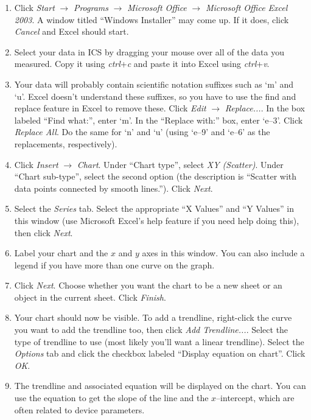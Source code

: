 \documentclass{article}
\begin{document}
\begin{enumerate}
  \item Click \textit{Start} $\rightarrow$ \textit{Programs} $\rightarrow$ \textit{Microsoft Office} $\rightarrow$ \textit{Microsoft Office Excel 2003}. A window titled ``Windows Installer'' may come up. If it does, click \textit{Cancel} and Excel should start.
  \item Select your data in ICS by dragging your mouse over all of the data you measured. Copy it using \textit{ctrl}+\textit{c} and paste it into Excel using \textit{ctrl}+\textit{v}.
  \item Your data will probably contain scientific notation suffixes such as `m' and `u'. Excel doesn't understand these suffixes, so you have to use the find and replace feature in Excel to remove these. Click \textit{Edit} $\rightarrow$ \textit{Replace...}. In the box labeled ``Find what:'', enter `m'. In the ``Replace with:'' box, enter `e--3'. Click \textit{Replace All}. Do the same for `n' and `u' (using `e--9' and `e--6' as the replacements, respectively).
  \item Click \textit{Insert} $\rightarrow$ \textit{Chart}. Under ``Chart type'', select \textit{XY (Scatter)}. Under ``Chart sub-type'', select the second option (the description is ``Scatter with data points connected by smooth lines.''). Click \textit{Next}.
  \item Select the \textit{Series} tab. Select the appropriate ``X Values'' and ``Y Values'' in this window (use Microsoft Excel's help feature if you need help doing this), then click \textit{Next}.
  \item Label your chart and the $x$ and $y$ axes in this window. You can also include a legend if you have more than one curve on the graph.
  \item Click \textit{Next}. Choose whether you want the chart to be a new sheet or an object in the current sheet. Click \textit{Finish}.
  \item Your chart should now be visible. To add a trendline, right-click the curve you want to add the trendline too, then click \textit{Add Trendline...}. Select the type of trendline to use (most likely you'll want a linear trendline). Select the \textit{Options} tab and click the checkbox labeled ``Display equation on chart''. Click \textit{OK}.
  \item The trendline and associated equation will be displayed on the chart. You can use the equation to get the slope of the line and the $x$--intercept, which are often related to device parameters.
\end{enumerate}
\end{document}
